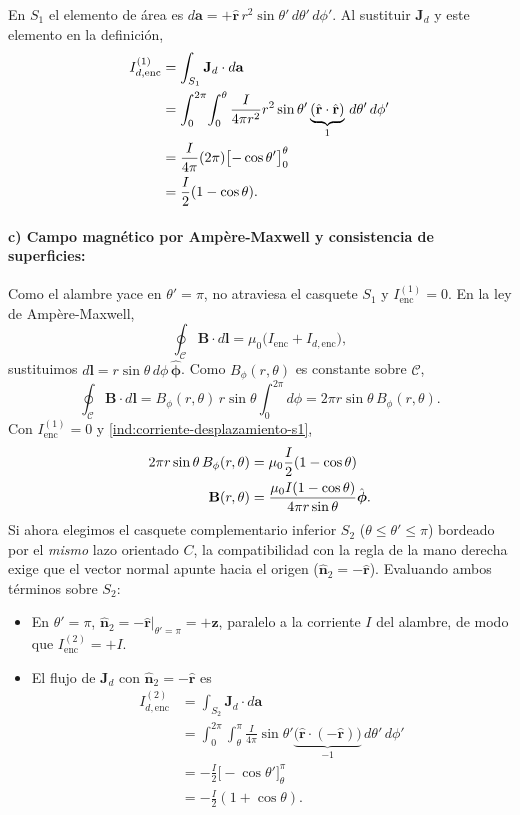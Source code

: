 \documentclass[11pt]{article}
\begin{document}
En $S_1$ el elemento de área es
$d\mathbf a=+\hat{\mathbf r}\,r^2\sin\theta'\,d\theta'\,d\phi'$.
Al sustituir $\mathbf J_d$ y este elemento en la definición,
\begin{align}
    I_{d,\mathrm{enc}}^{(1)}
    &=\int_{S_1}\mathbf J_d\cdot d\mathbf a
      \notag\\
    &=\int_0^{2\pi}\!\int_0^\theta
      \frac{I}{4\pi r^2}r^2\sin\theta'
      \underbrace{(\hat{\mathbf r}\cdot\hat{\mathbf r})}_{1}
      \,d\theta'\,d\phi'
      \notag\\
    &=\frac{I}{4\pi}(2\pi)\bigl[-\cos\theta'\bigr]_0^\theta
      \notag\\
    &=\frac{I}{2}(1-\cos\theta).
    \label{ind:corriente-desplazamiento-s1}
\end{align}
\paragraph{c) Campo magnético por Ampère-Maxwell y consistencia de superficies:}
Como el alambre yace en $\theta'=\pi$, no atraviesa el casquete
$S_1$ y $I_{\text{enc}}^{(1)}=0$. En la ley de Ampère-Maxwell,
\[
    \oint_{\mathcal C}\mathbf B\cdot d\mathbf l
    =\mu_0\bigl(I_{\mathrm{enc}}+I_{d,\mathrm{enc}}\bigr),
\]
sustituimos $d\mathbf l=r\sin\theta\,d\phi\,\hat{\boldsymbol\phi}$.
Como $B_\phi(r,\theta)$ es constante sobre $\mathcal C$,
\[
    \oint_{\mathcal C}\mathbf B\cdot d\mathbf l
    =B_\phi(r,\theta)\,r\sin\theta\int_0^{2\pi}d\phi
    =2\pi r\sin\theta\,B_\phi(r,\theta).
\]
Con $I_{\mathrm{enc}}^{(1)}=0$ y
\eqref{ind:corriente-desplazamiento-s1},
\begin{align}
    2\pi r\sin\theta\,B_\phi(r,\theta)
    &=\mu_0\frac I2(1-\cos\theta)
      \notag\\
    \mathbf B(r,\theta)
    &=\frac{\mu_0 I(1-\cos\theta)}{4\pi r\sin\theta}
      \hat{\boldsymbol\phi}.
    \label{ind:campo-ampere-maxwell}
\end{align}
Si ahora elegimos el casquete complementario inferior $S_2$ ($\theta \le \theta' \le \pi$) bordeado por el \textit{mismo} lazo orientado $C$, la compatibilidad con la regla de la mano derecha exige que el vector normal apunte hacia el origen ($\hat{\mathbf{n}}_2 = -\hat{\mathbf{r}}$). Evaluando ambos términos sobre $S_2$:
\begin{itemize}
    \item En $\theta' = \pi$, $\hat{\mathbf{n}}_2 = -\hat{\mathbf{r}}|_{\theta'=\pi} = +\hat{\mathbf{z}}$, paralelo a la corriente $I$ del alambre, de modo que $I_{\text{enc}}^{(2)} = +I$.
    \item El flujo de $\mathbf J_d$ con
    $\hat{\mathbf n}_2=-\hat{\mathbf r}$ es
    \begin{align*}
        I_{d,\mathrm{enc}}^{(2)}
        &=\int_{S_2}\mathbf J_d\cdot d\mathbf a\\
        &=\int_0^{2\pi}\!\int_\theta^\pi
          \frac{I}{4\pi}\sin\theta'
          \underbrace{\bigl(\hat{\mathbf r}\cdot(-\hat{\mathbf r})\bigr)}_{-1}
          \,d\theta'\,d\phi'\\
        &=-\frac I2\bigl[-\cos\theta'\bigr]_\theta^\pi\\
        &=-\frac I2(1+\cos\theta).
    \end{align*}
\end{itemize}
\end{document}
